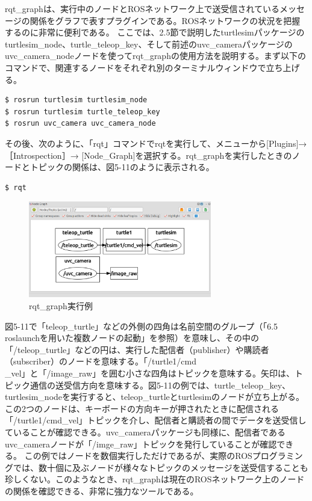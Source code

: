rqt\_graphは、実行中のノードとROSネットワーク上で送受信されているメッセージの関係をグラフで表すプラグインである。ROSネットワークの状況を把握するのに非常に便利である。
ここでは、2.5節で説明したturtlesimパッケージのturtlesim\_node、turtle\_teleop\_key、そして前述のuvc\_cameraパッケージのuvc\_camera\_nodeノードを使ってrqt\_graphの使用方法を説明する。まず以下のコマンドで、関連するノードをそれぞれ別のターミナルウィンドウで立ち上げる。

\begin{lstlisting}[language=ROS]
$ rosrun turtlesim turtlesim_node
$ rosrun turtlesim turtle_teleop_key
$ rosrun uvc_camera uvc_camera_node
\end{lstlisting}

その後、次のように、「rqt」コマンドでrqtを実行して、メニューから[Plugins]→［Introspection］→ [Node\_Graph]を選択する。rqt\_graphを実行したときのノードとトピックの関係は、図5-11のように表示される。

\begin{lstlisting}[language=ROS]
$ rqt
\end{lstlisting}

\begin{figure}[h]
  \centering
  \includegraphics[width=8cm]{pictures/chapter5/pic_05_11.png}
  \caption{rqt_graph実行例}
\end{figure}

図5-11で「teleop\_turtle」などの外側の四角は名前空間のグループ（「6.5 roslaunchを用いた複数ノードの起動」を参照）を意味し、その中の「/teleop\_turtle」などの円は、実行した配信者（publisher）や購読者（subscriber）のノードを意味する。「/turtle1/cmd\\\_vel」と「/image\_raw」を囲む小さな四角はトピックを意味する。矢印は、トピック通信の送受信方向を意味する。図5-11の例では、turtle\_teleop\_key、turtlesim\_nodeを実行すると、teleop\_turtleとturtlesimのノードが立ち上がる。この2つのノードは、キーボードの方向キーが押されたときに配信される「/turtle1/cmd\_vel」トピックを介し、配信者と購読者の間でデータを送受信していることが確認できる。uvc\_cameraパッケージも同様に、配信者であるuvc\_cameraノードが「/imge\_raw」トピックを発行していることが確認できる。
この例ではノードを数個実行しただけであるが、実際のROSプログラミングでは、数十個に及ぶノードが様々なトピックのメッセージを送受信することも珍しくない。このようなとき、rqt\_graphは現在のROSネットワーク上のノードの関係を確認できる、非常に強力なツールである。

